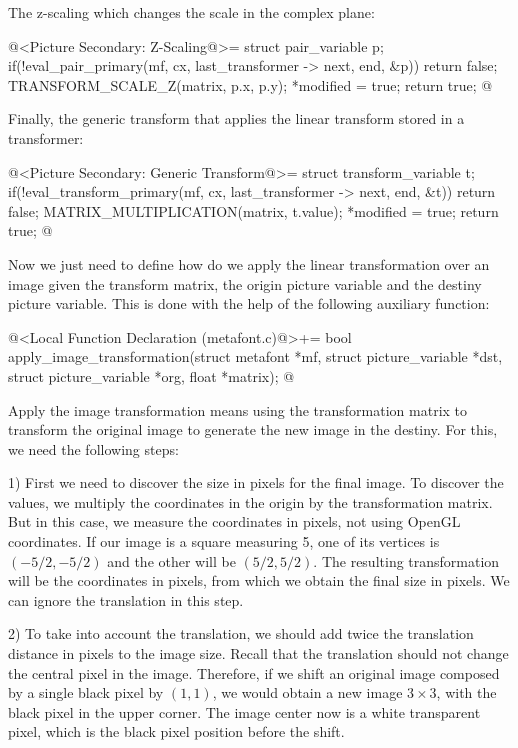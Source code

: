 {{{{{The z-scaling which changes the scale in the complex plane:

\iniciocodigo
@<Picture Secondary: Z-Scaling@>=
struct pair_variable p;
if(!eval_pair_primary(mf, cx, last_transformer -> next, end, &p))
  return false;
TRANSFORM_SCALE_Z(matrix, p.x, p.y);
*modified = true;
return true;
@
\fimcodigo

Finally, the generic transform that applies the linear transform
stored in a transformer:

\iniciocodigo
@<Picture Secondary: Generic Transform@>=
struct transform_variable t;
if(!eval_transform_primary(mf, cx, last_transformer -> next, end, &t))
  return false;
MATRIX_MULTIPLICATION(matrix, t.value);
*modified = true;
return true;
@
\fimcodigo

Now we just need to define how do we apply the linear transformation
over an image given the transform matrix, the origin picture variable
and the destiny picture variable. This is done with the help of the
following auxiliary function:

\iniciocodigo
@<Local Function Declaration (metafont.c)@>+=
bool apply_image_transformation(struct metafont *mf,
                                struct picture_variable *dst,
                                struct picture_variable *org,
                                float *matrix);
@
\fimcodigo

Apply the image transformation means using the transformation matrix
to transform the original image to generate the new image in the
destiny. For this, we need the following steps:

1) First we need to discover the size in pixels for the final
image. To discover the values, we multiply the coordinates in the
origin by the transformation matrix. But in this case, we measure the
coordinates in pixels, not using OpenGL coordinates. If our image is a
square measuring 5, one of its vertices is $(-5/2, -5/2)$ and the
other will be $(5/2, 5/2)$. The resulting transformation will be the
coordinates in pixels, from which we obtain the final size in
pixels. We can ignore the translation in this step.

2) To take into account the translation, we should add twice the
translation distance in pixels to the image size. Recall that the
translation should not change the central pixel in the
image. Therefore, if we shift an original image composed by a single
black pixel by $(1, 1)$, we would obtain a new image $3 \times 3$,
with the black pixel in the upper corner. The image center now is a
white transparent pixel, which is the black pixel position before the
shift.

}}}}}
